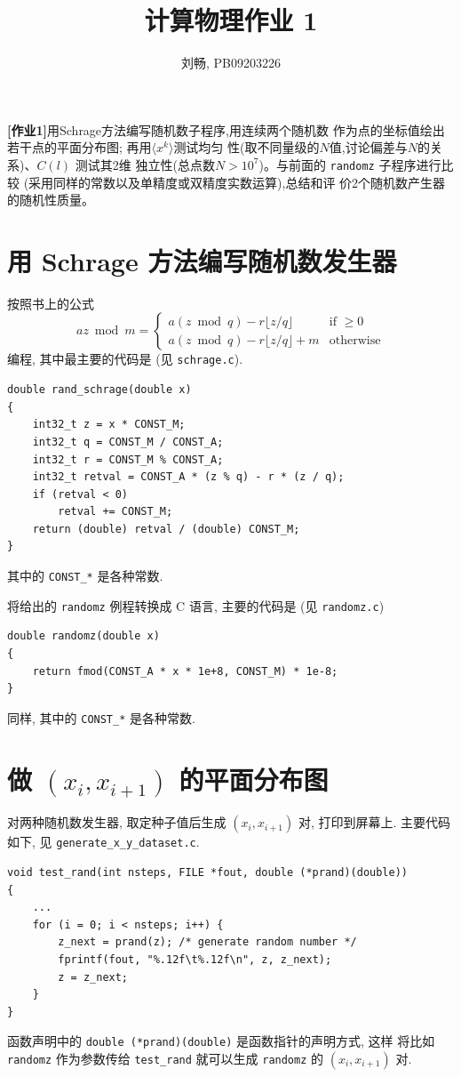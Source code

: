 \documentclass{ctexart}
\begin{document}
\title{计算物理作业 1}
\author{刘畅, PB09203226}
\maketitle

{\bf[作业1]}\quad 用Schrage方法编写随机数子程序,用连续两个随机数
作为点的坐标值绘出若干点的平面分布图; 再用$\langle x^k\rangle$测试均匀
性(取不同量级的$N$值,讨论偏差与$N$的关系)、$C(l)$ 测试其2维
独立性(总点数$N > 10^7$)。与前面的 \verb|randomz| 子程序进行比较
(采用同样的常数以及单精度或双精度实数运算),总结和评
价2个随机数产生器的随机性质量。

\section{用 Schrage 方法编写随机数发生器}
按照书上的公式
\[
az\bmod m = \begin{cases}
a(z\bmod q) - r\lfloor z/q \rfloor & \text{if } \geq 0\\
a(z\bmod q) - r\lfloor z/q \rfloor + m & \text{otherwise}
\end{cases}
\]
编程, 其中最主要的代码是 (见 \verb|schrage.c|).
\begin{verbatim}
double rand_schrage(double x)
{
    int32_t z = x * CONST_M;
    int32_t q = CONST_M / CONST_A;
    int32_t r = CONST_M % CONST_A;
    int32_t retval = CONST_A * (z % q) - r * (z / q);
    if (retval < 0)
        retval += CONST_M;
    return (double) retval / (double) CONST_M;
}
\end{verbatim}
其中的 \verb|CONST_*| 是各种常数.

将给出的 \verb|randomz| 例程转换成 C 语言, 主要的代码是 (见
\verb|randomz.c|)
\begin{verbatim}
double randomz(double x)
{
    return fmod(CONST_A * x * 1e+8, CONST_M) * 1e-8;
}
\end{verbatim}
同样, 其中的 \verb|CONST_*| 是各种常数.

\section{做  $(x_i,x_{i+1})$ 的平面分布图}
对两种随机数发生器, 取定种子值后生成 $(x_i,x_{i+1})$ 对, 打印到屏幕上.
主要代码如下, 见 \verb|generate_x_y_dataset.c|.
\begin{verbatim}
void test_rand(int nsteps, FILE *fout, double (*prand)(double))
{
    ...
    for (i = 0; i < nsteps; i++) {
        z_next = prand(z); /* generate random number */
        fprintf(fout, "%.12f\t%.12f\n", z, z_next);
        z = z_next;
    }
}
\end{verbatim}
函数声明中的 \verb|double (*prand)(double)| 是函数指针的声明方式, 这样
将比如 \verb|randomz| 作为参数传给 \verb|test_rand| 就可以生成 \verb|randomz|
的 $(x_i,x_{i+1})$ 对.
\end{document}
